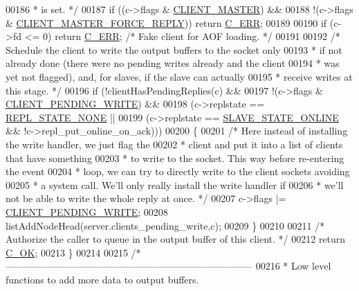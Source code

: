 \begin{DoxyCode}
00186 \textcolor{comment}{     * is set. */}
00187     \textcolor{keywordflow}{if} ((c->flags & \hyperlink{server_8h_a3d8f0cc8d0653ee2b6dafb454292c069}{CLIENT\_MASTER}) &&
00188         !(c->flags & \hyperlink{server_8h_a291fd012c9b504c52c371e7185f0a57c}{CLIENT\_MASTER\_FORCE\_REPLY})) \textcolor{keywordflow}{return} 
      \hyperlink{server_8h_af98ac28d5f4d23d7ed5985188e6fb7d1}{C\_ERR};
00189 
00190     \textcolor{keywordflow}{if} (c->fd <= 0) \textcolor{keywordflow}{return} \hyperlink{server_8h_af98ac28d5f4d23d7ed5985188e6fb7d1}{C\_ERR}; \textcolor{comment}{/* Fake client for AOF loading. */}
00191 
00192     \textcolor{comment}{/* Schedule the client to write the output buffers to the socket only}
00193 \textcolor{comment}{     * if not already done (there were no pending writes already and the client}
00194 \textcolor{comment}{     * was yet not flagged), and, for slaves, if the slave can actually}
00195 \textcolor{comment}{     * receive writes at this stage. */}
00196     \textcolor{keywordflow}{if} (!clientHasPendingReplies(c) &&
00197         !(c->flags & \hyperlink{server_8h_addd2e991874faef411339e9ae9619023}{CLIENT\_PENDING\_WRITE}) &&
00198         (c->replstate == \hyperlink{server_8h_a256b9506e551eaa7417f75f8fa9ed901}{REPL\_STATE\_NONE} ||
00199          (c->replstate == \hyperlink{server_8h_ad895fdf16e5ed5275d19ddf8578b900f}{SLAVE\_STATE\_ONLINE} && !c->repl\_put\_online\_on\_ack)))
00200     \{
00201         \textcolor{comment}{/* Here instead of installing the write handler, we just flag the}
00202 \textcolor{comment}{         * client and put it into a list of clients that have something}
00203 \textcolor{comment}{         * to write to the socket. This way before re-entering the event}
00204 \textcolor{comment}{         * loop, we can try to directly write to the client sockets avoiding}
00205 \textcolor{comment}{         * a system call. We'll only really install the write handler if}
00206 \textcolor{comment}{         * we'll not be able to write the whole reply at once. */}
00207         c->flags |= \hyperlink{server_8h_addd2e991874faef411339e9ae9619023}{CLIENT\_PENDING\_WRITE};
00208         listAddNodeHead(server.clients\_pending\_write,c);
00209     \}
00210 
00211     \textcolor{comment}{/* Authorize the caller to queue in the output buffer of this client. */}
00212     \textcolor{keywordflow}{return} \hyperlink{server_8h_a303769ef1065076e68731584e758d3e1}{C\_OK};
00213 \}
00214 
00215 \textcolor{comment}{/* -----------------------------------------------------------------------------}
00216 \textcolor{comment}{ * Low level functions to add more data to output buffers.}

\end{DoxyCode}
